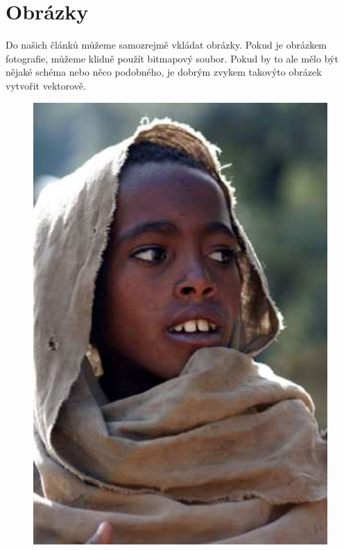 \documentclass[czech,a4paper,11pt]{article}
\begin{document}
\section{Obrázky}
Do našich článků můžeme samozrejmě vkládat obrázky. Pokud je obrázkem fotografie, můžeme klidně použít bitmapový soubor. Pokud by to ale mělo být nějaké schéma nebo něco podobného, je dobrým zvykem takovýto obrázek vytvořit vektorově.
\begin{figure}[h]
\center
{
\scalebox{0.4}
{
\includegraphics{etiopan.eps}
}}
\end{figure}
\end{document}

